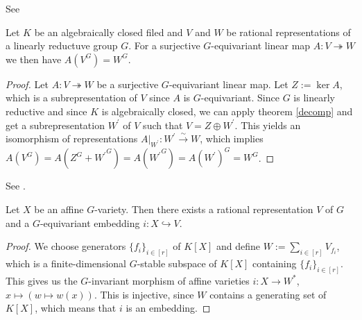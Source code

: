 \begin{lemma}\label{bloblo}
  See \cite[2.2.8]{DK15}

  Let $K$ be an algebraically closed filed and $V$ and $W$ be rational representations of a linearly reductuve group $G$.
  For a surjective $G$-equivariant linear map $A \colon V \twoheadrightarrow W$ we then have $A(V^G) = W^G$.
\end{lemma}

\begin{proof}
  Let $A \colon V \twoheadrightarrow W$ be a surjective $G$-equivariant linear map.
  Let $Z := \operatorname{ker}A$, which is a subrepresentation of $V$ since $A$ is $G$-equivariant.
  Since $G$ is linearly reductive and since $K$ is algebraically closed, we can apply theorem \ref{decomp} and get a subrepresentation $W^\prime$ of $V$ such that $V = Z \oplus W^\prime$.
  This yields an isomorphism of representations $\left. A \right|_{W^\prime} \colon W^\prime \xrightarrow{\sim} W$, which implies $A(V^G) = A(Z^G + {W^\prime}^G) = A({W^\prime}^G) = A(W^\prime)^G = W^G$.
\end{proof}

\begin{lemma}\label{emb}
  See \cite[A1.9]{DK15}.
  
  Let $X$ be an affine $G$-variety.
  Then there exists a rational representation $V$ of $G$ and a $G$-equivariant embedding $i \colon X \hookrightarrow V$.
\end{lemma}



\begin{proof}
  We choose generators $\{f_i\}_{i \in [r]}$ of $K[X]$ and define $W := \sum_{i \in [r]} V_{f_i}$, which is a finite-dimensional $G$-stable subspace of $K[X]$ containing $\{f_i\}_{i \in [r]}$.
  This gives us the $G$-invariant morphism of affine varieties $i \colon X \rightarrow W^\ast$, $x \mapsto (w \mapsto w(x))$.
  This is injective, since $W$ contains a generating set of $K[X]$, which means that $i$ is an embedding.
\end{proof}

